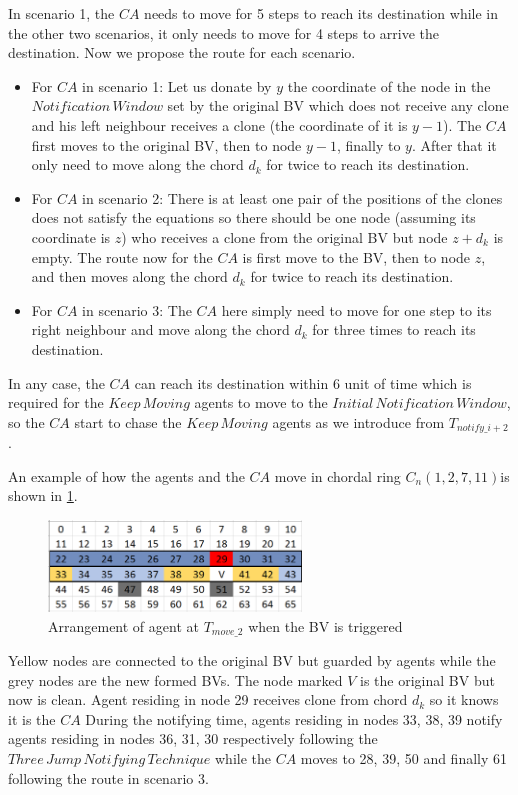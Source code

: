 In scenario 1, the $CA$ needs to move for 5 steps to reach its destination while in the other two scenarios, it only needs to move for 4 steps to arrive the destination. Now we propose the route for each scenario.
\begin{itemize}
\item For $CA$ in scenario 1: Let us donate by $y$ the coordinate of the node in the $Notification\,Window$ set by the original BV which does not receive any clone and his left neighbour receives a clone (the coordinate of it is $y-1$). The $CA$ first moves to the original BV, then to node $y-1$, finally to $y$. After that it only need to move along the chord $d_k$ for twice to reach its destination.
\item For $CA$ in scenario 2: There is at least one pair of the positions of the clones does not satisfy the equations so there should be one node (assuming its coordinate is $z$) who receives a clone from the original BV but node $z+d_k$ is empty. The route now for the $CA$ is first move to the BV, then to node $z$, and then moves along the chord $d_k$ for twice to reach its destination.
\item For $CA$ in scenario 3: The $CA$ here simply need to move for one step to its right neighbour and move along the chord $d_k$ for three times to reach its destination.
\end{itemize}

In any case, the $CA$ can reach its destination within 6 unit of time which is required for the $Keep\,Moving$ agents to move to the $Initial\,Notification\,Window$, so the $CA$ start to chase the $Keep\,Moving$ agents as we introduce from $T_{notify\_{i+2}}$. 

An example of how the agents and the $CA$ move in chordal ring $C_n(1, 2, 7, 11)$is shown in \ref{fig:T29}. 
\begin{figure}[H]
  \centering  
  \includegraphics[width=0.6\textwidth]{figures/T29.png}
  \caption{Arrangement of agent at $T_{move\_2}$ when the BV is triggered}\label{fig:T29}
\end{figure}

Yellow nodes are connected to the original BV but guarded by agents while the grey nodes are the new formed BVs. The node marked $V$ is the original BV but now is clean. Agent residing in node 29 receives clone from chord $d_k$ so it knows it is the $CA$ During the notifying time, agents residing in nodes 33, 38, 39 notify agents residing in nodes 36, 31, 30 respectively following the $Three\,Jump\,Notifying\,Technique$ while the $CA$ moves to 28, 39, 50 and finally 61 following the route in scenario 3.

